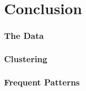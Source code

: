 \section{Conclusion}
\label{Con}

\subsubsection*{The Data}

\subsubsection*{Clustering}

\subsubsection*{Frequent Patterns}
